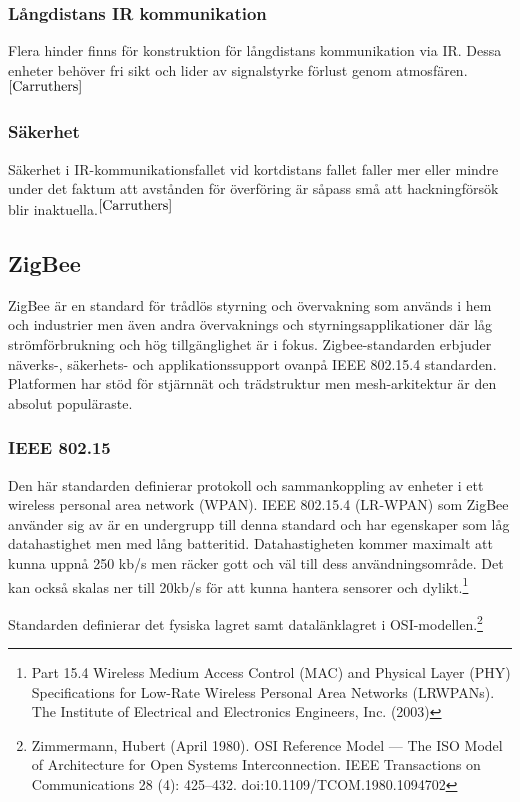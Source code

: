 \documentclass[a4paper,12pt,fleqn]{article}
\begin{document}
\subsubsection{Långdistans IR kommunikation}
Flera hinder finns för konstruktion för långdistans kommunikation via IR. Dessa enheter behöver fri sikt och lider av signalstyrke förlust genom atmosfären.$^{\ref{Carruthers}}$ 

\subsubsection{Säkerhet}
Säkerhet i IR-kommunikationsfallet vid kortdistans fallet faller mer eller mindre under det faktum att avstånden för överföring är såpass små att hackningförsök blir inaktuella.$^{\ref{Carruthers}}$

\subsection{ZigBee}
ZigBee är en standard för trådlös styrning och övervakning som används i hem och industrier men även andra övervaknings och styrningsapplikationer där låg strömförbrukning och hög tillgänglighet är i fokus. Zigbee-standarden erbjuder näverks-, säkerhets- och applikationssupport ovanpå IEEE 802.15.4 standarden. Platformen har stöd för stjärnnät och trädstruktur men mesh-arkitektur är den absolut populäraste. 

\subsubsection{IEEE 802.15}
Den här standarden definierar protokoll och sammankoppling av enheter i ett wireless personal area network (WPAN). IEEE 802.15.4 (LR-WPAN) som ZigBee använder sig av är en undergrupp till denna standard och har egenskaper som låg datahastighet men med lång batteritid. Datahastigheten kommer maximalt att kunna uppnå 250 kb/s men räcker gott och väl till dess användningsområde. Det kan också skalas ner till 20kb/s för att kunna hantera sensorer och dylikt.\footnote{Part 15.4 Wireless Medium Access Control (MAC) and Physical Layer (PHY) Specifications for Low-Rate Wireless Personal Area Networks (LR\text{-}WPANs). The Institute of Electrical and Electronics Engineers, Inc. (2003)}


Standarden definierar det fysiska lagret samt datalänklagret i OSI-modellen.\footnote{Zimmermann, Hubert (April 1980). OSI Reference Model — The ISO Model of Architecture for Open Systems Interconnection. IEEE Transactions on Communications 28 (4): 425–432. doi:10.1109/TCOM.1980.1094702} 
\end{document}
